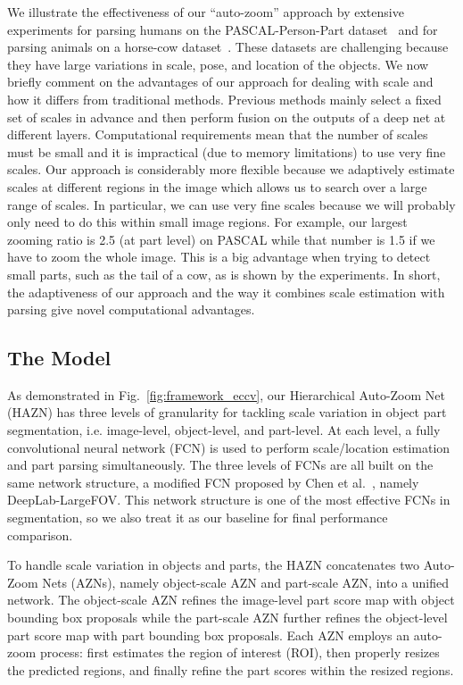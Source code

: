 We illustrate the effectiveness of our ``auto-zoom'' approach by extensive experiments for parsing humans on the PASCAL-Person-Part dataset~\cite{chen2014detect} and for parsing animals on a horse-cow dataset~\cite{wang2015semantic}. These datasets are challenging because they have large variations in scale, pose, and location of the objects. We now briefly comment on the advantages of our approach for dealing with scale and how it differs from traditional methods. Previous methods mainly select a fixed set of scales in advance and then perform fusion on the outputs of a deep net at different layers. Computational requirements mean that the number of scales must be small and it is impractical (due to memory limitations) to use very fine scales. Our approach is considerably more flexible because we adaptively estimate scales at different regions in the image which allows us to search over a large range of scales. In particular, we can use very fine scales because we will probably only need to do this within small image regions. For example, our largest zooming ratio is 2.5 (at part level) on PASCAL while that number is 1.5 if we have to zoom the whole image. This is a big advantage when trying to detect small parts, such as the tail of a cow, as is shown by the experiments. In short, the adaptiveness of our approach and the way it combines scale estimation with parsing give novel computational advantages.

\subsection{The Model}
As demonstrated in Fig.~\ref{fig:framework_eccv}, our Hierarchical Auto-Zoom Net (HAZN) has three levels of granularity for tackling scale variation in object part segmentation,
i.e. image-level, object-level, and part-level. At each level, a fully convolutional neural network (FCN) is used to perform scale/location estimation and part parsing simultaneously. The three levels of FCNs are all built on the same network structure, a modified FCN proposed by Chen et al.~\cite{chen2016deeplab}, namely DeepLab-LargeFOV. This network structure is one of the most effective FCNs in segmentation, so we also treat it as our baseline for final performance comparison.

To handle scale variation in objects and parts, the HAZN concatenates two Auto-Zoom Nets (AZNs), namely object-scale AZN and part-scale AZN, into a unified network. The object-scale AZN refines the image-level part score map with object bounding box proposals while the part-scale AZN further refines the object-level part score map with part bounding box proposals. Each AZN employs an auto-zoom process: first estimates the region of interest (ROI), then properly resizes the predicted regions, and finally refine the part scores within the resized regions.

